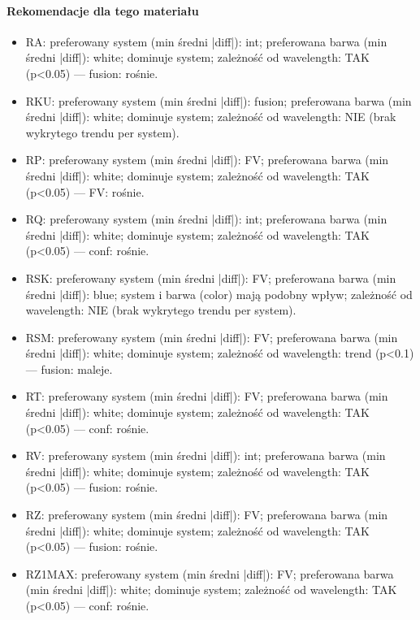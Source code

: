 \documentclass[
  10pt,
]{article}
\begin{document}
\paragraph{Rekomendacje dla tego materiału}
\begin{itemize}
\item RA: preferowany system (min średni |diff|): int; preferowana barwa (min średni |diff|): white; dominuje system; zależność od wavelength: TAK (p<0.05) — fusion: rośnie.
\item RKU: preferowany system (min średni |diff|): fusion; preferowana barwa (min średni |diff|): white; dominuje system; zależność od wavelength: NIE (brak wykrytego trendu per system).
\item RP: preferowany system (min średni |diff|): FV; preferowana barwa (min średni |diff|): white; dominuje system; zależność od wavelength: TAK (p<0.05) — FV: rośnie.
\item RQ: preferowany system (min średni |diff|): int; preferowana barwa (min średni |diff|): white; dominuje system; zależność od wavelength: TAK (p<0.05) — conf: rośnie.
\item RSK: preferowany system (min średni |diff|): FV; preferowana barwa (min średni |diff|): blue; system i barwa (color) mają podobny wpływ; zależność od wavelength: NIE (brak wykrytego trendu per system).
\item RSM: preferowany system (min średni |diff|): FV; preferowana barwa (min średni |diff|): white; dominuje system; zależność od wavelength: trend (p<0.1) — fusion: maleje.
\item RT: preferowany system (min średni |diff|): FV; preferowana barwa (min średni |diff|): white; dominuje system; zależność od wavelength: TAK (p<0.05) — conf: rośnie.
\item RV: preferowany system (min średni |diff|): int; preferowana barwa (min średni |diff|): white; dominuje system; zależność od wavelength: TAK (p<0.05) — fusion: rośnie.
\item RZ: preferowany system (min średni |diff|): FV; preferowana barwa (min średni |diff|): white; dominuje system; zależność od wavelength: TAK (p<0.05) — fusion: rośnie.
\item RZ1MAX: preferowany system (min średni |diff|): FV; preferowana barwa (min średni |diff|): white; dominuje system; zależność od wavelength: TAK (p<0.05) — conf: rośnie.
\end{itemize}
\end{document}
